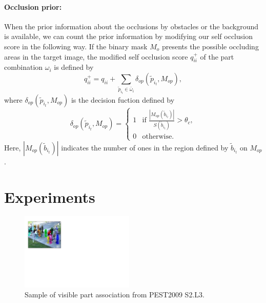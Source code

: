 \documentclass[runningheads]{llncs}
\begin{document}
\paragraph{Occlusion prior:}
When the prior information about the occlusions by obstacles or the background is available, we can count the prior information by modifying our self occlusion score in the following way.
If the binary mask $M_o$ presents the possible occluding areas in the target image, the modified self occlusion score $q_{ii}^+$ of the part combination $\omega_i$ is defined by
\begin{equation}
   \label{eq:occlusion_prior_score}
   q_{ii}^+ = q_{ii} + \sum_{\tilde{p}_{i_t} \in \bar{\omega}_i} \delta_{op}(\tilde{p}_{i_t}, M_{op}),
\end{equation}
where $\delta_{op}(\tilde{p}_{i_t}, M_{op})$ is the decision fuction defined by
\begin{equation}
   \label{eq:occlusion_prior_count_function}
   \delta_{op}(\tilde{p}_{i_t}, M_{op}) = 
    \begin{cases}
      1 & \text{if $\frac{|M_{op}(\tilde{b}_{i_t})|}{S(\tilde{b}_{i_t})} > \theta_c $}, \\
      0 & \text{otherwise}.
   \end{cases}
\end{equation}
Here, $|M_{op}(\tilde{b}_{i_t})|$ indicates the number of ones in the region defined by $\tilde{b}_{i_t}$ on $M_{op}$.



\section{Experiments}
\begin{figure}[t]
   \includegraphics[width=0.48\textwidth]{../figures/visible_part_association.pdf}
   \caption{Sample of visible part association from PEST2009 S2.L3.}
   \label{fig:visible_part_association}
\end{figure}
\end{document}
